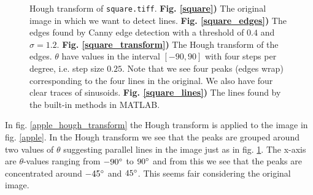 \documentclass[a4paper, 10pt, final]{article}
\begin{document}
\begin{figure}[!h]
    \caption[]{
    Hough transform of \texttt{square.tiff}.
    \textbf{Fig. \ref{square})} The original image in which
    we want to detect lines.
    \textbf{Fig. \ref{square_edges})} The edges found by Canny edge
    detection with a threshold of $0.4$ and $\sigma = 1.2$.
    \textbf{Fig. \ref{square_transform})} The Hough transform of the
    edges. $\theta$ have values in the interval $[-90,90]$ with four
    steps per degree, i.e. step size $0.25$. Note that we see four peaks
    (edges wrap) corresponding to the four lines in the original. We
    also have four clear traces of sinusoids.
    \textbf{Fig. \ref{square_lines})} The lines found by the built-in
    methods in MATLAB.
    }
    \label{square_hough_transform}
\end{figure}

In fig. \ref{apple_hough_transform} the Hough transform is applied to
the image in fig. \ref{apple}. In the Hough transform we see that the
peaks are grouped around two values of $\theta$ suggesting parallel
lines in the image just as in fig. \ref{square_hough_transform}. The
x-axis are $\theta$-values ranging from $-90^\circ$ to $90^\circ$ and
from this we see that the peaks are concentrated around $-45^\circ$ and
$45^\circ$. This seems fair considering the original image.
\end{document}
